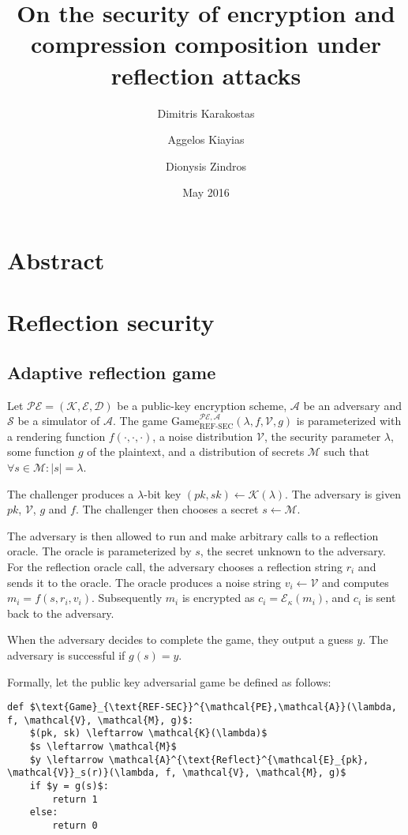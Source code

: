 \documentclass{article}
\title{On the security of encryption and compression composition under reflection attacks}
\author{
Dimitris Karakostas
\and
Aggelos Kiayias
\and
Dionysis Zindros
}
\date{May 2016}
\begin{document}
\maketitle

\section{Abstract}

\section{Reflection security}

\subsection{Adaptive reflection game}

Let $\mathcal{PE} = (\mathcal{K}, \mathcal{E}, \mathcal{D})$ be a public-key
encryption scheme, $\mathcal{A}$ be an adversary and $\mathcal{S}$ be a
simulator of $\mathcal{A}$.  The game
$\text{Game}_{\text{REF-SEC}}^{\mathcal{PE},\mathcal{A}}(\lambda,  f,
\mathcal{V}, g)$ is parameterized with a rendering function $f(\cdot, \cdot,
\cdot)$, a noise distribution $\mathcal{V}$, the security parameter $\lambda$,
some function $g$ of the plaintext, and a distribution of secrets $\mathcal{M}$
such that $\forall s \in \mathcal{M}: |s| = \lambda$.

The challenger produces a $\lambda$-bit key $(pk, sk) \leftarrow
\mathcal{K}(\lambda)$. The adversary is given $pk$, $\mathcal{V}$, $g$ and $f$.
The challenger then chooses a secret $s \leftarrow \mathcal{M}$.

The adversary is then allowed to run and make arbitrary calls to a reflection
oracle. The oracle is parameterized by $s$, the secret unknown to the
adversary.  For the reflection oracle call, the adversary chooses a reflection
string $r_i$ and sends it to the oracle. The oracle produces a noise string
$v_i \leftarrow \mathcal{V}$ and computes $m_i = f(s, r_i, v_i)$.  Subsequently
$m_i$ is encrypted as $c_i = \mathcal{E}_\kappa(m_i)$, and $c_i$ is sent back
to the adversary.

When the adversary decides to complete the game, they output a guess $y$. The
adversary is successful if $g(s) = y$.

Formally, let the public key adversarial game be defined as follows:

\begin{lstlisting}[texcl,mathescape]
def $\text{Game}_{\text{REF-SEC}}^{\mathcal{PE},\mathcal{A}}(\lambda, f, \mathcal{V}, \mathcal{M}, g)$:
    $(pk, sk) \leftarrow \mathcal{K}(\lambda)$
    $s \leftarrow \mathcal{M}$
    $y \leftarrow \mathcal{A}^{\text{Reflect}^{\mathcal{E}_{pk}, \mathcal{V}}_s(r)}(\lambda, f, \mathcal{V}, \mathcal{M}, g)$
    if $y = g(s)$:
        return 1
    else:
        return 0
\end{lstlisting}
\end{document}
